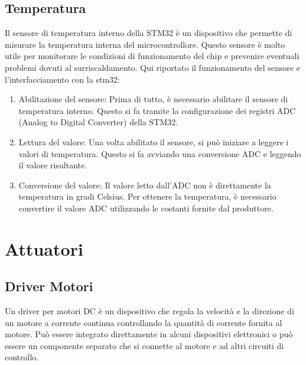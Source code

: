 \documentclass{article}
\begin{document}
\subsection{Temperatura}
Il sensore di temperatura interno della STM32 è un dispositivo che permette di misurare la temperatura interna del microcontrollore. Questo sensore è molto utile per monitorare le condizioni di funzionamento del chip e prevenire eventuali problemi dovuti al surriscaldamento.
Qui riportato il funzionamento del sensore e l'interfacciamento con la stm32:

\begin{enumerate}
    \item Abilitazione del sensore: Prima di tutto, è necessario abilitare il sensore di temperatura interno. Questo si fa tramite la configurazione dei registri ADC (Analog to Digital Converter) della STM32.
    \item Lettura del valore: Una volta abilitato il sensore, si può iniziare a leggere i valori di temperatura. Questo si fa avviando una conversione ADC e leggendo il valore risultante.
    \item Conversione del valore: Il valore letto dall’ADC non è direttamente la temperatura in gradi Celsius. Per ottenere la temperatura, è necessario convertire il valore ADC utilizzando le costanti fornite dal produttore.
\end{enumerate}
\newpage

\section{Attuatori}
\subsection{Driver Motori }
Un driver per motori DC è un dispositivo che regola la velocità e la direzione di un motore a corrente continua controllando la quantità di corrente fornita al motore. Può essere integrato direttamente in alcuni dispositivi elettronici o può essere un componente separato che si connette al motore e ad altri circuiti di controllo.
\end{document}

